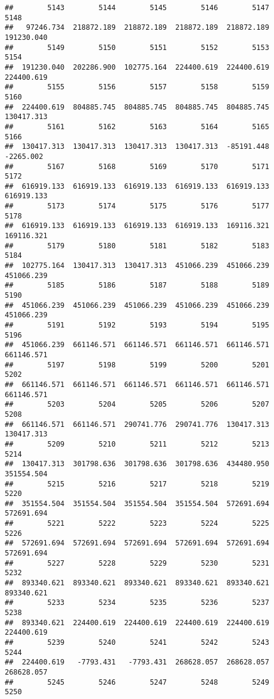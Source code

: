 \documentclass[
]{book}
\begin{document}
\begin{verbatim}
##        5143        5144        5145        5146        5147        5148 
##   97246.734  218872.189  218872.189  218872.189  218872.189  191230.040 
##        5149        5150        5151        5152        5153        5154 
##  191230.040  202286.900  102775.164  224400.619  224400.619  224400.619 
##        5155        5156        5157        5158        5159        5160 
##  224400.619  804885.745  804885.745  804885.745  804885.745  130417.313 
##        5161        5162        5163        5164        5165        5166 
##  130417.313  130417.313  130417.313  130417.313  -85191.448   -2265.002 
##        5167        5168        5169        5170        5171        5172 
##  616919.133  616919.133  616919.133  616919.133  616919.133  616919.133 
##        5173        5174        5175        5176        5177        5178 
##  616919.133  616919.133  616919.133  616919.133  169116.321  169116.321 
##        5179        5180        5181        5182        5183        5184 
##  102775.164  130417.313  130417.313  451066.239  451066.239  451066.239 
##        5185        5186        5187        5188        5189        5190 
##  451066.239  451066.239  451066.239  451066.239  451066.239  451066.239 
##        5191        5192        5193        5194        5195        5196 
##  451066.239  661146.571  661146.571  661146.571  661146.571  661146.571 
##        5197        5198        5199        5200        5201        5202 
##  661146.571  661146.571  661146.571  661146.571  661146.571  661146.571 
##        5203        5204        5205        5206        5207        5208 
##  661146.571  661146.571  290741.776  290741.776  130417.313  130417.313 
##        5209        5210        5211        5212        5213        5214 
##  130417.313  301798.636  301798.636  301798.636  434480.950  351554.504 
##        5215        5216        5217        5218        5219        5220 
##  351554.504  351554.504  351554.504  351554.504  572691.694  572691.694 
##        5221        5222        5223        5224        5225        5226 
##  572691.694  572691.694  572691.694  572691.694  572691.694  572691.694 
##        5227        5228        5229        5230        5231        5232 
##  893340.621  893340.621  893340.621  893340.621  893340.621  893340.621 
##        5233        5234        5235        5236        5237        5238 
##  893340.621  224400.619  224400.619  224400.619  224400.619  224400.619 
##        5239        5240        5241        5242        5243        5244 
##  224400.619   -7793.431   -7793.431  268628.057  268628.057  268628.057 
##        5245        5246        5247        5248        5249        5250 

\end{verbatim}
\end{document}
